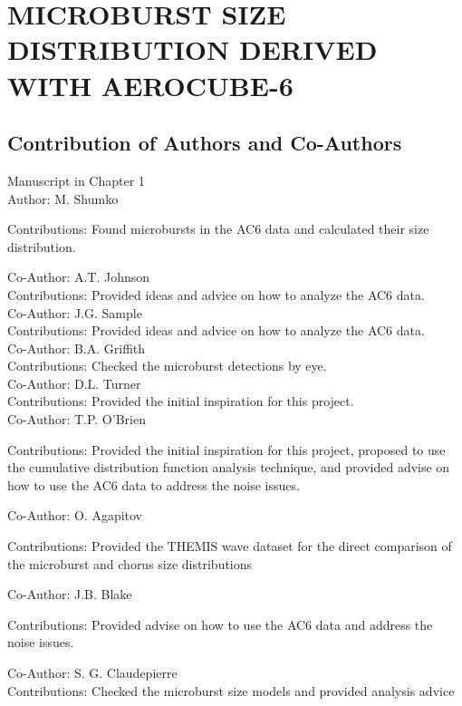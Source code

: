 

\chapter{MICROBURST SIZE DISTRIBUTION DERIVED WITH AEROCUBE-6} \label{CH:ac6_study}

\section{Contribution of Authors and \noindent \noindent Co-Authors} 
\noindent Manuscript in Chapter 1 \\ 

\noindent Author: M. Shumko
\begin{singlespace} \noindent Contributions: Found microbursts in the AC6 data and calculated their size distribution. \end{singlespace}
\noindent \noindent Co-Author: A.T. Johnson \\
\noindent Contributions: Provided ideas and advice on how to analyze the AC6 data. \\
\noindent \noindent Co-Author: J.G. Sample \\
\noindent Contributions: Provided ideas and advice on how to analyze the AC6 data. \\
\noindent \noindent Co-Author: B.A. Griffith \\
\noindent Contributions: Checked the microburst detections by eye. \\
\noindent Co-Author: D.L. Turner \\
\noindent Contributions: Provided the initial inspiration for this project. \\
\noindent Co-Author: T.P. O’Brien
\begin{singlespace} \noindent Contributions: Provided the initial inspiration for this project, proposed to use the cumulative distribution function analysis technique, and provided advise on how to use the AC6 data to address the noise issues.  \end{singlespace}
\noindent Co-Author: O. Agapitov
\begin{singlespace} \noindent Contributions: Provided the THEMIS wave dataset for the direct comparison of the microburst and chorus size distributions \end{singlespace}
\noindent Co-Author: J.B. Blake
\begin{singlespace} \noindent Contributions: Provided advise on how to use the AC6 data and address the noise issues. \end{singlespace}
\noindent Co-Author: S. G. Claudepierre \\
\noindent Contributions: Checked the microburst size models and provided analysis advice
\newpage

